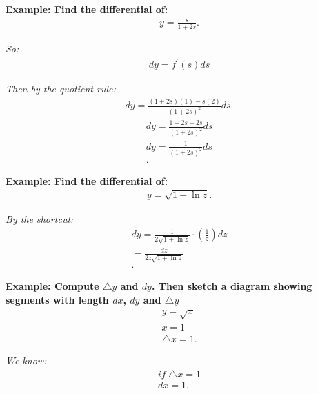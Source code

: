 \documentclass{report}
\begin{document}
    \pagebreak \bigbreak \noindent
    \begin{mdframed}
      \textbf{Example: Find the differential of:}
      \begin{align*}
        y = \frac{s}{1+2s}
      .\end{align*}
    \end{mdframed}
    \bigbreak \noindent
    \textit{So:}
    \begin{align*}
     dy = f^{\prime}(s)ds 
    \end{align*}

    \bigbreak \noindent 
    \textit{Then by the quotient rule:}
    \begin{align*}
      dy = \frac{(1+2s)(1) - s(2)}{(1+2s)^{2}}ds
    .\end{align*}
    \begin{align*}
      dy = \frac{1+2s - 2s}{(1+2s)^{2}}ds \\
      dy = \frac{1}{(1+2s)^{2}}ds \\
    .\end{align*}

    \bigbreak \noindent 
    \begin{mdframed}
      \textbf{Example: Find the differential of:}
      \begin{align*}
        y = \sqrt{1+\ln{z}}
      .\end{align*}
    \end{mdframed}

    \bigbreak \noindent 
    \textit{By the shortcut:}
    \begin{align*}
      dy = \frac{1}{2\sqrt{1+\ln{z}}} \cdot (\frac{1}{z})dz \\
      = \frac{dz}{2z\sqrt{1+\ln{z}}} \\
    .\end{align*}

    \bigbreak \noindent 
    \begin{mdframed}
      \textbf{Example: Compute $\triangle y$ and $dy$. Then sketch a diagram showing segments with length $dx$, $dy$ 
        and $\triangle y$
      }
      \begin{align*}
        y = \sqrt{x} \\ 
        x =1 \\
        \triangle x = 1
      .\end{align*}
    \end{mdframed}

    \bigbreak \noindent 
    \textit{We know:}
    \begin{align*}
      if\ \triangle x = 1 \\
      dx = 1
    .\end{align*}
\end{document}

